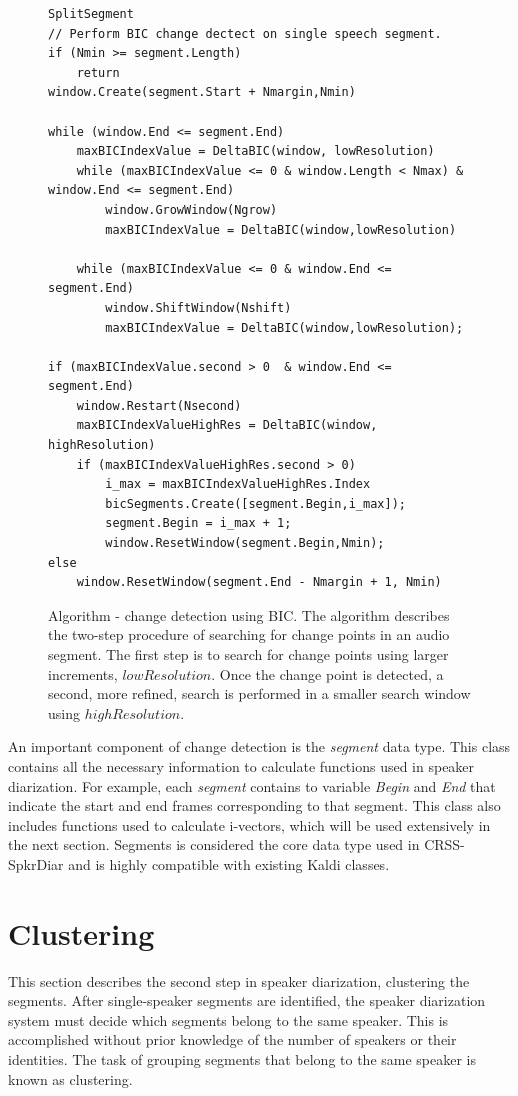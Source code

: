 \begin{figure}
\begin{lstlisting}
SplitSegment
// Perform BIC change dectect on single speech segment.
if (Nmin >= segment.Length) 
	return
window.Create(segment.Start + Nmargin,Nmin)

while (window.End <= segment.End) 
	maxBICIndexValue = DeltaBIC(window, lowResolution)
	while (maxBICIndexValue <= 0 & window.Length < Nmax) & window.End <= segment.End) 
		window.GrowWindow(Ngrow)
		maxBICIndexValue = DeltaBIC(window,lowResolution)
		
	while (maxBICIndexValue <= 0 & window.End <= segment.End) 
		window.ShiftWindow(Nshift)
		maxBICIndexValue = DeltaBIC(window,lowResolution);
	
if (maxBICIndexValue.second > 0  & window.End <= segment.End) 
	window.Restart(Nsecond)
	maxBICIndexValueHighRes = DeltaBIC(window, highResolution)
	if (maxBICIndexValueHighRes.second > 0) 
		i_max = maxBICIndexValueHighRes.Index
		bicSegments.Create([segment.Begin,i_max]);
		segment.Begin = i_max + 1;
		window.ResetWindow(segment.Begin,Nmin);
else 
	window.ResetWindow(segment.End - Nmargin + 1, Nmin)
\end{lstlisting}
\caption{Algorithm - change detection using BIC. The algorithm describes the two-step procedure of searching for change points in an audio segment. The first step is to search for change points using larger increments, $lowResolution$. Once the change point is detected, a second, more refined, search is performed in a smaller search window using $highResolution$.}
\label{alg:changedetection}
\end{figure}

An important component of change detection is the {\it segment} data type. 
This class contains all the necessary information to calculate functions used in speaker diarization. 
For example, each {\it segment} contains to variable {\it Begin} and {\it End} that indicate the start and end frames corresponding to that segment. 
This class also includes functions used to calculate i-vectors, which will be used extensively in the next section. 
Segments is considered the core data type used in CRSS-SpkrDiar and is highly compatible with existing Kaldi classes. 

\newpage
\section{Clustering}
\label{sec:clustering}
This section describes the second step in speaker diarization, clustering the segments. 
After single-speaker segments are identified, the speaker diarization system must decide which segments belong to the same speaker. 
This is accomplished without prior knowledge of the number of speakers or their identities. 
The task of grouping segments that belong to the same speaker is known as clustering. 

